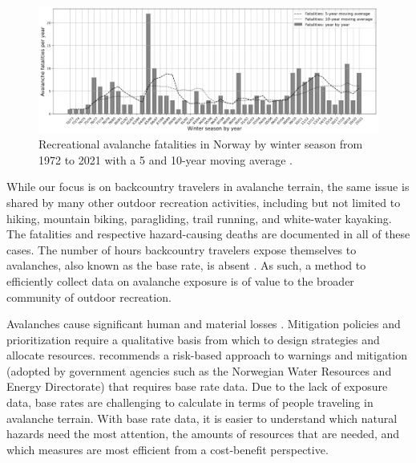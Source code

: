 \documentclass[authordate,empirical]{jote-new-article}
\begin{document}
\begin{figure}
  \begin{fullwidth}


    \includegraphics[width=\linewidth]{media/image1.png}
    \caption{Recreational avalanche fatalities in Norway by winter season from 1972 to 2021 with a 5 and 10-year moving average \parencites{NGI2019}{Varsom2021}.}
    \label{fig:rId8}

  \end{fullwidth}
\end{figure}






While our focus is on backcountry travelers in avalanche terrain, the same issue is shared by many other outdoor recreation activities, including but not limited to hiking, mountain biking, paragliding, trail running, and white-water kayaking. The fatalities and respective hazard-causing deaths are documented in all of these cases. The number of hours backcountry travelers expose themselves to avalanches, also known as the base rate, is absent \parencites{Johnson2020}{Kahneman1973}. As such, a method to efficiently collect data on avalanche exposure is of value to the broader community of outdoor recreation.







Avalanches cause significant human and material losses \parencites{Schweizer2008}. Mitigation policies and prioritization require a qualitative basis from which to design strategies and allocate resources. \textcite{WMO2021} recommends a risk-based approach to warnings and mitigation (adopted by government agencies such as the Norwegian Water Resources and Energy Directorate) that requires base rate data. Due to the lack of exposure data, base rates are challenging to calculate in terms of people traveling in avalanche terrain. With base rate data, it is easier to understand which natural hazards need the most attention, the amounts of resources that are needed, and which measures are most efficient from a cost-benefit perspective.
\end{document}
